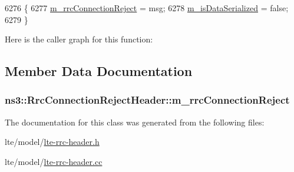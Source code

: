 \begin{DoxyCode}
6276 \{
6277   \hyperlink{classns3_1_1RrcConnectionRejectHeader_aabe4cf962d737cab542008b7ded50fc6}{m\_rrcConnectionReject} = msg;
6278   \hyperlink{classns3_1_1Asn1Header_ae39d42f09e8ec85d8180843625fc92ba}{m\_isDataSerialized} = \textcolor{keyword}{false};
6279 \}
\end{DoxyCode}


Here is the caller graph for this function\+:




\subsection{Member Data Documentation}
\subsubsection[{\texorpdfstring{m\+\_\+rrc\+Connection\+Reject}{m_rrcConnectionReject}}]{ ns3\+::\+Rrc\+Connection\+Reject\+Header\+::m\+\_\+rrc\+Connection\+Reject\hspace{0.3cm}{\ttfamily [private]}}\hypertarget{classns3_1_1RrcConnectionRejectHeader_aabe4cf962d737cab542008b7ded50fc6}{}\label{classns3_1_1RrcConnectionRejectHeader_aabe4cf962d737cab542008b7ded50fc6}


The documentation for this class was generated from the following files\+:\begin{DoxyCompactItemize}
\item 
lte/model/\hyperlink{lte-rrc-header_8h}{lte-\/rrc-\/header.\+h}\item 
lte/model/\hyperlink{lte-rrc-header_8cc}{lte-\/rrc-\/header.\+cc}\end{DoxyCompactItemize}
